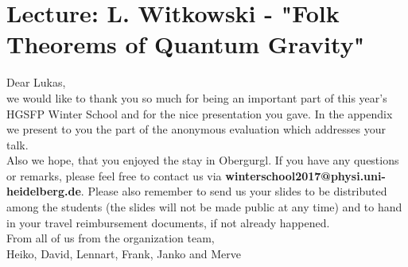 \documentclass[11pt,a4paper]{article}
\begin{document}
\section*{Lecture: L. Witkowski - "Folk Theorems of Quantum Gravity"}

Dear Lukas,\\
we would like to thank you so much for being an important part of this year's HGSFP Winter School and for the nice presentation you gave.
In the appendix we present to you the part of the anonymous evaluation which addresses your talk.\\
Also we hope, that you enjoyed the stay in Obergurgl. If you have any questions or remarks, please feel free to contact us via \textbf{winterschool2017@physi.uni-heidelberg.de}. Please also remember to send us your slides to be distributed among the students (the slides will not be made public at any time) and to hand in your travel reimbursement documents, if not already happened.\\
From all of us from the organization team,\\
Heiko, David, Lennart, Frank, Janko and Merve
\end{document}
